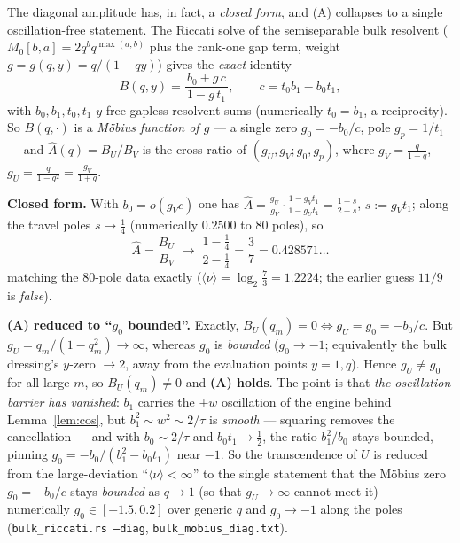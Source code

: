 \begin{remark}[The exact M\"obius structure: $\widehat A=3/7$, and (A) reduced to a boundedness]\label{rem:mobius}
The diagonal amplitude has, in fact, a \emph{closed form}, and (A) collapses to a single
oscillation-free statement. The Riccati solve of the semiseparable bulk resolvent
($M_0[b,a]=2q^bq^{\max(a,b)}$ plus the rank-one gap term, weight $g=g(q,y)=q/(1-qy)$) gives the
\emph{exact} identity
\[
   B(q,y)=\frac{b_0+g\,c}{\,1-g\,t_1\,},\qquad c=t_0b_1-b_0t_1,
\]
with $b_0,b_1,t_0,t_1$ $y$-free gapless-resolvent sums (numerically $t_0=b_1$, a reciprocity). So
$B(q,\cdot)$ is a \emph{M\"obius function of $g$} --- a single zero $g_0=-b_0/c$, pole $g_p=1/t_1$ ---
and $\widehat A(q)=B_U/B_V$ is the cross-ratio of $(g_U,g_V;g_0,g_p)$, where $g_V=\tfrac{q}{1-q}$,
$g_U=\tfrac{q}{1-q^2}=\tfrac{g_V}{1+q}$.

\textbf{Closed form.} With $b_0=o(g_Vc)$ one has
$\widehat A=\tfrac{g_U}{g_V}\cdot\tfrac{1-g_Vt_1}{1-g_Ut_1}=\tfrac{1-s}{2-s}$, $s:=g_Vt_1$; along the
travel poles $s\to\tfrac14$ (numerically $0.2500$ to $80$ poles), so
\[
   \widehat A=\frac{B_U}{B_V}\;\longrightarrow\;\frac{1-\frac14}{2-\frac14}=\frac{3}{7}=0.428571\ldots
\]
matching the $80$-pole data exactly ($\langle\nu\rangle=\log_2\tfrac73=1.2224$; the earlier guess
$11/9$ is \emph{false}).

\textbf{(A) reduced to ``$g_0$ bounded''.} Exactly, $B_U(q_m)=0\iff g_U=g_0=-b_0/c$. But
$g_U=q_m/(1-q_m^2)\to\infty$, whereas $g_0$ is \emph{bounded} ($g_0\to-1$; equivalently the bulk
dressing's $y$-zero $\to2$, away from the evaluation points $y=1,q$). Hence $g_U\ne g_0$ for all large
$m$, so $B_U(q_m)\ne0$ and \textbf{(A) holds}. The point is that \emph{the oscillation barrier has
vanished}: $b_1$ carries the $\pm w$ oscillation of the engine behind Lemma~\ref{lem:cos}, but
$b_1^2\sim w^2\sim2/\tau$ is \emph{smooth} --- squaring removes the cancellation --- and with
$b_0\sim2/\tau$ and $b_0t_1\to\tfrac12$, the ratio $b_1^2/b_0$ stays bounded, pinning
$g_0=-b_0/(b_1^2-b_0t_1)$ near $-1$. So the transcendence of $U$ is reduced from the large-deviation ``$\langle\nu\rangle<\infty$'' to the
single statement that the M\"obius zero $g_0=-b_0/c$ stays \emph{bounded} as $q\to1$ (so that
$g_U\to\infty$ cannot meet it) --- numerically $g_0\in[-1.5,0.2]$ over generic $q$ and $g_0\to-1$ along
the poles (\texttt{bulk\_riccati.rs --diag}, \texttt{bulk\_mobius\_diag.txt}).


\end{remark}
